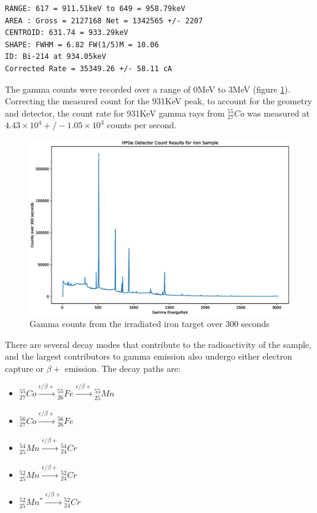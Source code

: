 \begin{lstlisting}[style=sMaestro,caption={Maestro 931KeV Peak Measurement},captionpos=b]
RANGE: 617 = 911.51keV to 649 = 958.79keV
AREA : Gross = 2127168 Net = 1342565 +/- 2207
CENTROID: 631.74 = 933.29keV
SHAPE: FWHM = 6.82 FW(1/5)M = 10.06
ID: Bi-214 at 934.05keV
Corrected Rate = 35349.26 +/- 58.11 cA
\end{lstlisting}

The gamma counts were recorded over a range of 0MeV to 3MeV (figure \ref{fig:measuredgammacounts}). Correcting the measured count for the 931KeV peak, to account for the geometry and detector, the count rate for 931KeV gamma rays from ${}^{55}_{27} Co$ was measured at $4.43\times10^4 +/- 1.05 \times 10^3$ counts per second.

\begin{figure}[ht] 
  \centering
  \begin{minipage}[b]{0.85\linewidth}
    \centering
    \includegraphics[width=.9\linewidth]{chapters/activity_code/experimental/gamma_counts.eps} 
    \caption{Gamma counts from the irradiated iron target over 300 seconds}  
    \label{fig:measuredgammacounts}
  \end{minipage}%
\end{figure}

There are several decay modes that contribute to the radioactivity of the sample, and the largest contributors to gamma emission also undergo either electron capture or $\beta +$ emission.  The decay paths are:

\begin{itemize}
\item ${}^{55}_{27}Co \xrightarrow[]{\epsilon/\beta +} {}^{55}_{26}Fe \xrightarrow[]{\epsilon/\beta +} {}^{55}_{25}Mn$
\item ${}^{56}_{27}Co \xrightarrow[]{\epsilon/\beta +} {}^{56}_{26}Fe$
\item ${}^{54}_{25}Mn \xrightarrow[]{\epsilon/\beta +} {}^{54}_{24}Cr$
\item ${}^{52}_{25}Mn \xrightarrow[]{\epsilon/\beta +} {}^{52}_{24}Cr$ 
\item ${}^{52}_{25}Mn^{*} \xrightarrow[]{\epsilon/\beta +} {}^{52}_{24}Cr$
\end{itemize}

